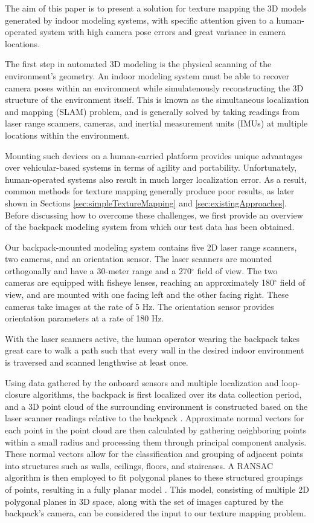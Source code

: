\message{ !name(paper.tex)}\documentclass[10pt,twocolumn,letterpaper]{article}
\begin{document}
The aim of this paper is to present a solution for texture mapping the
3D models generated by indoor modeling systems, with specific
attention given to a human-operated system with high camera pose
errors and great variance in camera locations.

The first step in automated 3D modeling is the physical scanning of
the environment's geometry. An indoor modeling system must be able to
recover camera poses within an environment while simulatenously
reconstructing the 3D structure of the environment itself. This is
known as the simultaneous localization and mapping (SLAM) problem, and
is generally solved by taking readings from laser range scanners,
cameras, and inertial measurement units (IMUs) at multiple locations
within the environment.

Mounting such devices on a human-carried platform provides unique
advantages over vehicular-based systems in terms of agility and
portability. Unfortunately, human-operated systems also result in much
larger localization error. As a result, common methods for texture
mapping generally produce poor results, as later shown in Sections
\ref{sec:simpleTextureMapping} and
\ref{sec:existingApproaches}. Before discussing how to overcome these
challenges, we first provide an overview of the backpack modeling
system from which our test data has been obtained.

Our backpack-mounted modeling system contains five 2D laser range
scanners, two cameras, and an orientation sensor. The laser scanners
are mounted orthogonally and have a 30-meter range and a 270$^{\circ}$
field of view. The two cameras are equipped with fisheye lenses,
reaching an approximately 180$^{\circ}$ field of view, and are mounted
with one facing left and the other facing right. These cameras take
images at the rate of 5 Hz. The orientation sensor provides
orientation parameters at a rate of 180 Hz.

With the laser scanners active, the human operator wearing the
backpack takes great care to walk a path such that every wall in the
desired indoor environment is traversed and scanned lengthwise at
least once.

Using data gathered by the onboard sensors and multiple localization
and loop-closure algorithms, the backpack is first localized over its
data collection period, and a 3D point cloud of the surrounding
environment is constructed based on the laser scanner readings
relative to the backpack \cite{chen2010indoor, kua2012loopclosure, liu2010indoor}. Approximate normal vectors for each point in
the point cloud are then calculated by gathering neighboring points
within a small radius and processing them through principal component
analysis. These normal vectors allow for the classification and
grouping of adjacent points into structures such as walls, ceilings,
floors, and staircases. A RANSAC algorithm is then employed to fit
polygonal planes to these structured groupings of points, resulting in
a fully planar model \cite{sanchez2012point}. This model, consisting
of multiple 2D polygonal planes in 3D space, along with the set of
images captured by the backpack's camera, can be considered the input
to our texture mapping problem.
\end{document}
